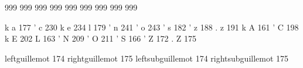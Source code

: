 \startmapping[pl2]

 999  %
 999  %
 999  %
 999  %
 999  %
 999  %
 999  %
 999  %
 999  %

\stopmapping 

\startencoding[pl2]

  k a 177 %
  ' c 230 %
  k e 234 %
 l 179 %
  ' n 241 %
  ' o 243 %
  ' s 182 %
  ' z 188 %
  . z 191 %
  k A 161 %
  ' C 198 %
  k E 202 %
 L 163 %
  ' N 209 %
  ' O 211 %
  ' S 166 %
  ' Z 172 %
  . Z 175 %

\stopencoding 

\startencoding[pl2]

 leftguillemot      174  %
 rightguillemot     175  %
 leftsubguillemot   174  %
 rightsubguillemot  175  %

\stopencoding

\endinput 
